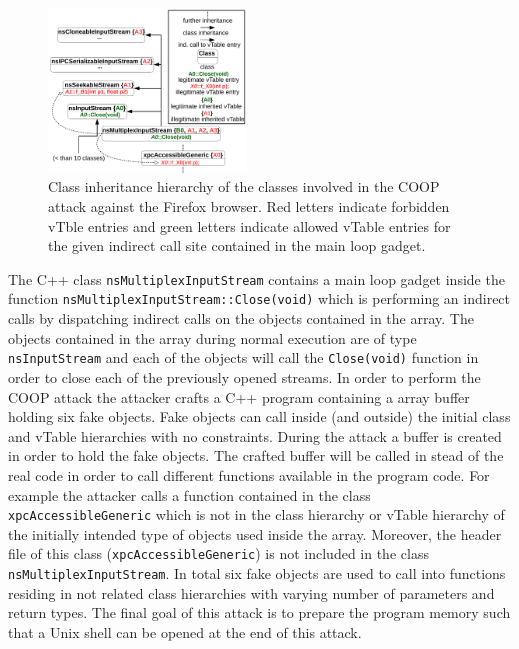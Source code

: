 \begin{figure}[h]
    \centering
    \includegraphics[width=0.47\textwidth]{figures/class_hierarchy.pdf}
\caption{Class inheritance hierarchy of the classes involved in the COOP attack against the Firefox browser. Red letters 
indicate forbidden vTble entries and green letters indicate allowed vTable entries for the given indirect call site
contained in the main loop gadget.}
\label{Class exploit}
\end{figure}

The C++ class \texttt{nsMultiplexInputStream} contains a main loop gadget inside the function 
\texttt{nsMultiplexInputStream::Close(void)} which is performing an indirect calls by dispatching
indirect calls on the objects contained in the array. 
The objects contained in the array during normal execution are of type \texttt{nsInputStream} and each
of the objects will call the \texttt{Close(void)} function in order to close each of the previously opened streams.
In order to perform the COOP attack the attacker crafts a C++ program containing a array buffer holding 
six fake objects. Fake objects can call inside (and outside) the initial class and vTable hierarchies
with no constraints.
During the attack a buffer is created in order to hold the fake objects.
The crafted buffer will be called in stead of the real code in order to call different functions
available in the program code. For example the attacker calls a function contained in the class
\texttt{xpcAccessibleGeneric} which is not in the class hierarchy or vTable hierarchy
of the initially intended type of objects used inside the array.
Moreover, the header file of this class (\texttt{xpcAccessibleGeneric}) is not included in the 
class \texttt{nsMultiplexInputStream}.
In total six fake objects are used to call into functions residing in not related class hierarchies with varying 
number of parameters and return types. The final goal of this attack is to prepare the program memory such 
that a Unix shell can be opened at the end of this attack.

